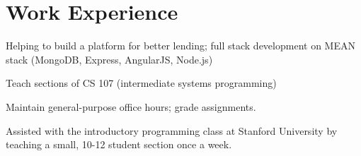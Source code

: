 \documentclass[letterpaper]{deedy-resume} %
\begin{document}
%
\begin{minipage}[t]{0.66\textwidth} %


\section{Work Experience}


\vspace{\topsep} %
\begin{tightitemize}
\item Helping to build a platform for better lending; full stack development on MEAN stack (MongoDB, Express, AngularJS, Node.js)
\end{tightitemize}

\sectionspace %

\begin{tightitemize}
\item Teach sections of CS 107 (intermediate systems programming)
\item Maintain general-purpose office hours; grade assignments.
\end{tightitemize}

\sectionspace %

\begin{tightitemize}
\item Assisted with the introductory programming class at Stanford University by teaching a small, 10-12 student section once a week.
\end{tightitemize}

\sectionspace %


\end{minipage}
\end{document}
